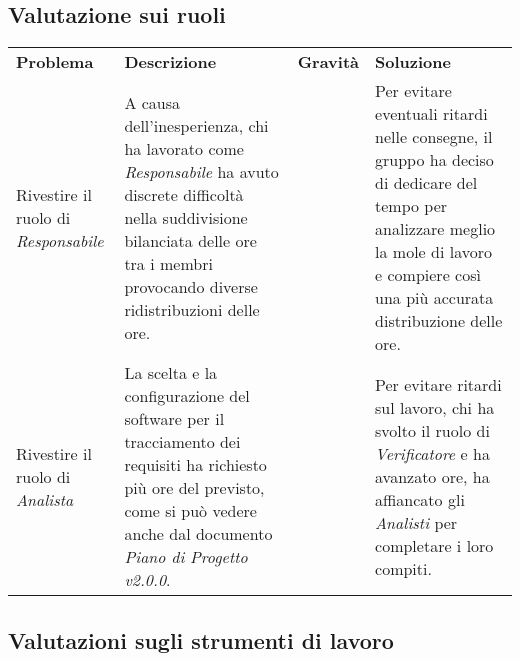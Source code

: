 \subsection{Valutazione sui ruoli}
\begin{table}[H]
	\renewcommand{\arraystretch}{1.5}
	\caption{Tabella delle problematiche relative ai ruoli}	
	\begin{longtable}{ >{\centering}p{} >{}p{}
			>{\centering}p{} >{}p{}}
			
		\rowcolorhead
		\textbf{\color{white}Problema} 
		& \centering\textbf{\color{white}Descrizione} 
		& \centering\textbf{\color{white}Gravità}
		& \textbf{\color{white}Soluzione} 
		\tabularnewline %
		
		Rivestire il ruolo di \textit{Responsabile} &
		A causa dell'inesperienza, chi ha lavorato come \textit{Responsabile} ha avuto discrete
		difficoltà nella suddivisione bilanciata delle ore tra i membri provocando 
		diverse ridistribuzioni delle ore. &
		3 &
		Per evitare eventuali ritardi nelle consegne, il gruppo ha deciso di dedicare 
		del tempo per analizzare meglio la mole di lavoro e compiere così una più
		accurata distribuzione delle ore.
						
		\tabularnewline 
		Rivestire il ruolo di \textit{Analista} &
		La scelta e la configurazione del software per il tracciamento dei requisiti
		ha richiesto più ore del previsto, come si può vedere anche dal documento
		\textit{Piano di Progetto v2.0.0}. &
		2 &
		Per evitare ritardi sul lavoro, chi ha svolto il ruolo di \textit{Verificatore}
		e ha avanzato ore, ha affiancato gli \textit{Analisti} per completare 
		i loro compiti.
			
	\end{longtable}
	
\end{table}

\subsection{Valutazioni sugli strumenti di lavoro}
	\renewcommand{\arraystretch}{1.5}
		
